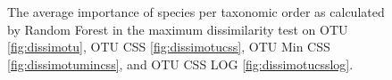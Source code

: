 \begin{figure}[h]
	\caption{The average importance of species per taxonomic order as calculated by Random Forest in the maximum dissimilarity test on OTU \ref{fig:dissimotu}, OTU CSS \ref{fig:dissimotucss}, OTU Min CSS \ref{fig:dissimotumincss}, and OTU CSS LOG \ref{fig:dissimotucsslog}.  }
	\label{fig:dispie}
\end{figure}


